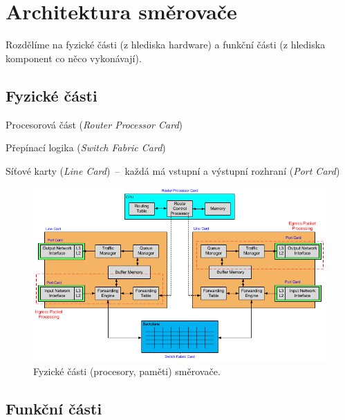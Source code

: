 
\section{Architektura směrovače}

Rozdělíme na fyzické části (z hlediska hardware) a funkční části (z hlediska komponent co něco vykonávají).

\subsection{Fyzické části}

\begin{compactitem}
    \item Procesorová část (\textit{Router Processor Card})
    \item Přepínací logika (\textit{Switch Fabric Card})
    \item Síťové karty (\textit{Line Card})~--~každá má vstupní a výstupní rozhraní (\textit{Port Card})
\end{compactitem}

\begin{figure}[H]
    \centering
    \includegraphics[width=1\linewidth]{architektura_fyzicke_casti.pdf}
    \caption{Fyzické části (procesory, paměti) směrovače.}
\end{figure}

\subsection{Funkční části}

